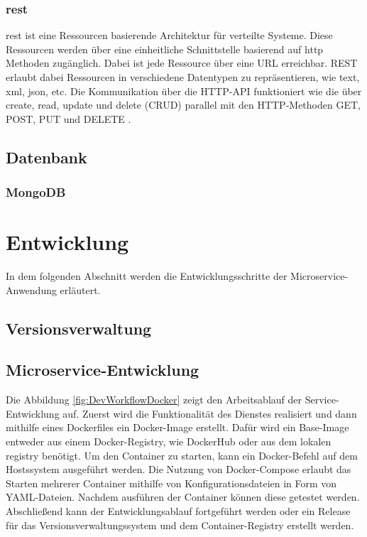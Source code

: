 \subsubsection{\ac{rest}}
\acs{rest} ist eine Ressourcen basierende Architektur für verteilte Systeme.
Diese Ressourcen werden über eine einheitliche Schnittstelle basierend auf 
\acs{http} Methoden zugänglich.
Dabei ist jede Ressource über eine URL erreichbar.
REST erlaubt dabei Ressourcen in verschiedene Datentypen zu repräsentieren, wie text, xml, json, etc.
Die Kommunikation über die HTTP-API funktioniert wie die über create, read, update und delete (CRUD) parallel mit den HTTP-Methoden GET, POST, PUT und DELETE \cite{fundamentalsRestfulAPI}.

\subsection{Datenbank}

\subsubsection{MongoDB}

\section{Entwicklung}
In dem folgenden Abschnitt werden die Entwicklungsschritte der Microservice-Anwendung erläutert.

\subsection{Versionsverwaltung}

\subsection{Microservice-Entwicklung}

Die Abbildung \ref{fig:DevWorkflowDocker} zeigt den Arbeitsablauf der Service-Entwicklung auf.
Zuerst wird die Funktionalität des Dienstes realisiert und dann mithilfe eines Dockerfiles ein Docker-Image erstellt.
Dafür wird ein Base-Image entweder aus einem Docker-Registry, wie DockerHub oder aus dem lokalen registry benötigt.
Um den Container zu starten, kann ein Docker-Befehl auf dem Hostssystem ausgeführt werden.
Die Nutzung von Docker-Compose erlaubt das Starten mehrerer Container mithilfe von Konfigurationsdateien in Form von YAML-Dateien.
Nachdem ausführen der Container können diese getestet werden.
Abschließend kann der Entwicklungsablauf fortgeführt werden oder ein Release für das Versionsverwaltungssystem und dem Container-Registry erstellt werden.



